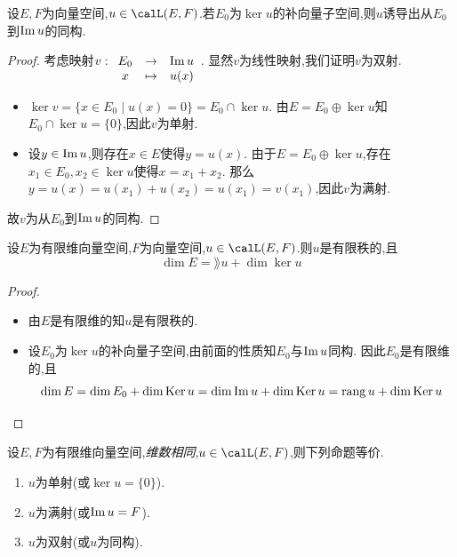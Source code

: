 \begin{prop}
    设$E, F$为向量空间,$u \in \calL(E, F)$.若$E_0$为$\ker u$的补向量子空间,则$u$诱导出从$E_0$到$\operatorname{Im} u$的同构.
\end{prop}

\begin{proof}
    考虑映射$v: \begin{array}[t]{ccc} E_0 & \to & \operatorname{Im} u \\ x & \mapsto & u(x) \end{array}$.
    显然$v$为线性映射,我们证明$v$为双射.

    \begin{itemize}
        \item $\ker v = \{ x \in E_0 \mid u(x) = 0 \} = E_0 \cap \ker u$.
            由$E = E_0 \oplus \ker u$知$E_0 \cap \ker u = \{ 0 \}$,因此$v$为单射.
        \item 设$y \in \operatorname{Im} u$,则存在$x \in E$使得$y = u(x)$.
            由于$E = E_0 \oplus \ker u$,存在$x_1 \in E_0, x_2 \in \ker u$使得$x = x_1 + x_2$.
            那么$y = u(x) = u(x_1) + u(x_2) = u(x_1) = v(x_1)$,因此$v$为满射.
    \end{itemize}

    故$v$为从$E_0$到$\operatorname{Im} u$的同构.
\end{proof}

\begin{thm}
    设$E$为有限维向量空间,$F$为向量空间,$u \in \calL(E, F)$.则$u$是有限秩的,且\[ \dim E = \rang u + \dim \ker u \]
\end{thm}

\begin{proof} $\ $
    \begin{itemize}
        \item 由$E$是有限维的知$u$是有限秩的.
        \item 设$E_0$为$\ker u$的补向量子空间,由前面的性质知$E_0$与$\operatorname{Im} u$同构.
        因此$E_0$是有限维的,且\[ \dim E = \dim E_0 + \dim \operatorname{Ker} u = \dim \operatorname{Im} u + \dim \operatorname{Ker} u = \operatorname{rang} u + \dim \operatorname{Ker} u \]
    \end{itemize}
\end{proof}

\begin{thm}
    设$E, F$为有限维向量空间,\textit{维数相同},$u \in \calL(E, F)$,则下列命题等价.

    \begin{enumerate}
        \item $u$为单射(或$\ker u = \{ 0 \}$).
        \item $u$为满射(或$\operatorname{Im} u = F$).
        \item $u$为双射(或$u$为同构).
    \end{enumerate}
\end{thm}


